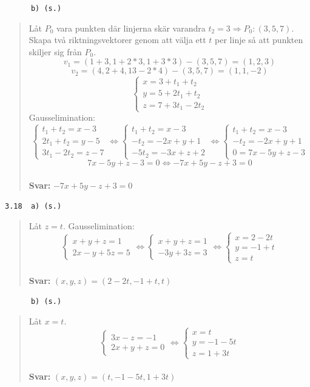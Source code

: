 \documentclass[a4paper]{article}
\newcommand{\tskcol}[1]{\textcolor{tskcol}{#1}}
\begin{document}
\texttt{\tskcol{~~~~~~b) (s.)}}
\begin{quotation}
	\noindent
	Låt $P_0$ vara punkten där linjerna skär varandra $t_2=3 \Rightarrow P_0:(3,5,7)$.
	Skapa två riktningsvektorer genom att välja ett $t$ per linje så att punkten skiljer sig från $P_0$.
	\[v_1=(1+3,1+2*3,1+3*3)-(3,5,7)=(1,2,3)\]
	\[v_2=(4,2+4,13-2*4)-(3,5,7)=(1,1,-2)\]
	\[\begin{cases}
	x=3+t_1+t_2 \\
	y=5+2t_1+t_2 \\
	z=7+3t_1-2t_2
	\end{cases}\]
	Gausselimination:
	\[\begin{cases}
	t_1+t_2=x-3 \\
	2t_1+t_2=y-5 \\
	3t_1-2t_2=z-7
	\end{cases} \Leftrightarrow
	\begin{cases}
	t_1+t_2=x-3 \\
	-t_2=-2x+y+1 \\
	-5t_2=-3x+z+2
	\end{cases} \Leftrightarrow
	\begin{cases}
	t_1+t_2=x-3 \\
	-t_2=-2x+y+1 \\
	0=7x-5y+z-3
	\end{cases}\]
	\[7x-5y+z-3=0 \Leftrightarrow
	-7x+5y-z+3=0\]
	\\
	\textbf{Svar:} $-7x+5y-z+3=0$
\end{quotation}

\texttt{\tskcol{3.18~~a) (s.)}}
\begin{quotation}
	\noindent
	Låt $z=t$. Gausselimination:
	\[\begin{cases}
	x+y+z=1 \\
	2x-y+5z=5
	\end{cases} \Leftrightarrow
	\begin{cases}
	x+y+z=1 \\
	-3y+3z=3
	\end{cases} \Leftrightarrow
	\begin{cases}
	x=2-2t \\
	y=-1+t \\
	z=t
	\end{cases}\]
	\\
	\textbf{Svar:} $(x,y,z)=(2-2t,-1+t,t)$
\end{quotation}

\pagebreak
\texttt{\tskcol{~~~~~~b) (s.)}}
\begin{quotation}
	\noindent
	Låt $x=t$.
	\[\begin{cases}
	3x-z=-1 \\
	2x+y+z=0
	\end{cases} \Leftrightarrow
	\begin{cases}
	x=t \\
	y=-1-5t \\
	z=1+3t
	\end{cases}\]
	\\
	\textbf{Svar:} $(x,y,z)=(t,-1-5t,1+3t)$
\end{quotation}
\end{document}
